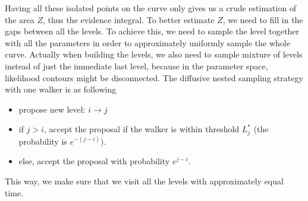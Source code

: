 
Having all these isolated points on the curve only gives us a crude estimation of the area $Z$, thus the evidence integral. To better estimate $Z$, we need to fill in the gaps between all the levels. To achieve this, we need to sample the level together with all the parameters in order to approximately uniformly sample the whole curve. Actually when building the levels, we also need to sample mixture of levels instead of just the immediate last level, because in the parameter space, likelihood contours might be disconnected. The diffusive nested sampling strategy with one walker is as following \citep{brewer11a}
\begin{sffamily}
\begin{itemize}
\item propose new level: $i \rightarrow j$
\item if $j > i$, accept the proposal if the walker is within threshold $L_j^*$ (the probability is $e^{-(j-i)}$).
\item else, accept the proposal with probability $e^{j-i}$.
\end{itemize}
\end{sffamily}
This way, we make sure that we visit all the levels with approximately equal time.


